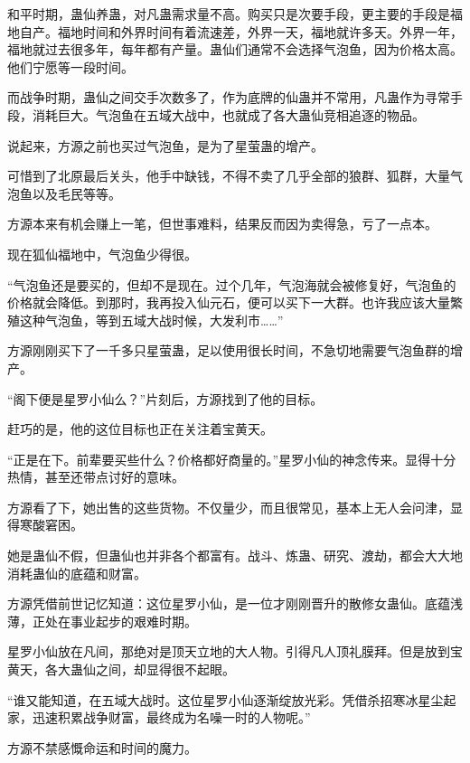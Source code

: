 
\begin{this_body}



和平时期，蛊仙养蛊，对凡蛊需求量不高。购买只是次要手段，更主要的手段是福地自产。福地时间和外界时间有着流速差，外界一天，福地就许多天。外界一年，福地就过去很多年，每年都有产量。蛊仙们通常不会选择气泡鱼，因为价格太高。他们宁愿等一段时间。

而战争时期，蛊仙之间交手次数多了，作为底牌的仙蛊并不常用，凡蛊作为寻常手段，消耗巨大。气泡鱼在五域大战中，也就成了各大蛊仙竞相追逐的物品。

说起来，方源之前也买过气泡鱼，是为了星萤蛊的增产。

可惜到了北原最后关头，他手中缺钱，不得不卖了几乎全部的狼群、狐群，大量气泡鱼以及毛民等等。

方源本来有机会赚上一笔，但世事难料，结果反而因为卖得急，亏了一点本。

现在狐仙福地中，气泡鱼少得很。

“气泡鱼还是要买的，但却不是现在。过个几年，气泡海就会被修复好，气泡鱼的价格就会降低。到那时，我再投入仙元石，便可以买下一大群。也许我应该大量繁殖这种气泡鱼，等到五域大战时候，大发利市……”

方源刚刚买下了一千多只星萤蛊，足以使用很长时间，不急切地需要气泡鱼群的增产。

“阁下便是星罗小仙么？”片刻后，方源找到了他的目标。

赶巧的是，他的这位目标也正在关注着宝黄天。

“正是在下。前辈要买些什么？价格都好商量的。”星罗小仙的神念传来。显得十分热情，甚至还带点讨好的意味。

方源看了下，她出售的这些货物。不仅量少，而且很常见，基本上无人会问津，显得寒酸窘困。

她是蛊仙不假，但蛊仙也并非各个都富有。战斗、炼蛊、研究、渡劫，都会大大地消耗蛊仙的底蕴和财富。

方源凭借前世记忆知道：这位星罗小仙，是一位才刚刚晋升的散修女蛊仙。底蕴浅薄，正处在事业起步的艰难时期。

星罗小仙放在凡间，那绝对是顶天立地的大人物。引得凡人顶礼膜拜。但是放到宝黄天，各大蛊仙之间，却显得很不起眼。

“谁又能知道，在五域大战时。这位星罗小仙逐渐绽放光彩。凭借杀招寒冰星尘起家，迅速积累战争财富，最终成为名噪一时的人物呢。”

方源不禁感慨命运和时间的魔力。


\end{this_body}

